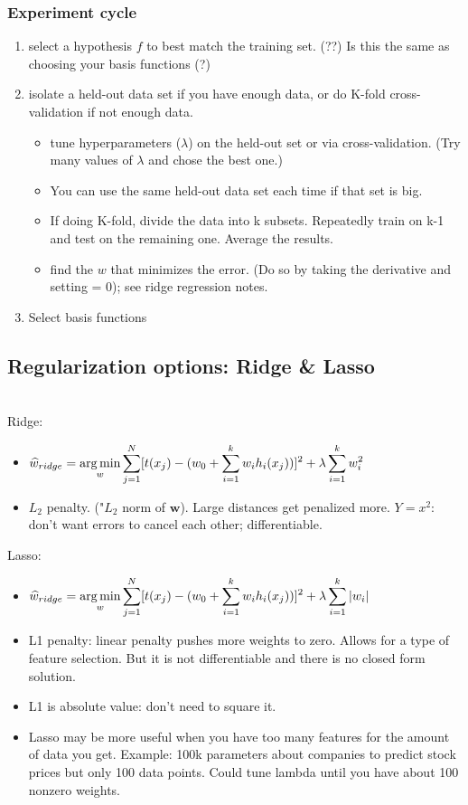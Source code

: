 \subsubsection{Experiment cycle}
\begin{enumerate}
	\item select a hypothesis $f$ to best match the training set.  
		(??) Is this the same as choosing your basis functions (?)
	\item isolate a held-out data set if you have enough data, or do K-fold cross-validation if not enough data. 
	\begin{itemize}
		\item tune hyperparameters ($\lambda$) on the held-out set or via cross-validation.  
			(Try many values of $\lambda$ and chose the best one.) 
		\item You can use the same held-out data set each time if that set is big.  
		\item If doing K-fold, divide the data into k subsets.  
				Repeatedly train on k-1 and test on the remaining one.  
				Average the results. 
		\item find the $w$ that minimizes the error.  
			(Do so by taking the derivative and setting = 0); 
			see ridge regression notes. 
	\end{itemize}
	\item Select basis functions
\end{enumerate}

\subsection{Regularization options: Ridge \& Lasso}  \hfill \\
Ridge: 
\begin{itemize}
	\item $ \displaystyle \widehat{w}_{ridge} = \operatorname*{arg\,min}_w \sum_{j=1}^N [t(x_j) - (w_0 + \sum_{i=1}^k w_i h_i(x_j))]^2 + \lambda \sum_{i=1}^k w_i^2   $ 
	\item $L_2$ penalty.  ("$L_2$ norm of $\bm{w}$).  
		Large distances get penalized more.  $Y = x^2$: 
		don't want errors to cancel each other; differentiable. 
\end{itemize}
Lasso: \hfill \\
\begin{itemize}
	\item$ \displaystyle \widehat{w}_{ridge} = \operatorname*{arg\,min}_w \sum_{j=1}^N [t(x_j) - (w_0 + \sum_{i=1}^k w_i h_i(x_j))]^2 + \lambda \sum_{i=1}^k |w_i|   $ 
	\item L1 penalty: linear penalty pushes more weights to zero.  Allows for a type of feature selection.  But it is not differentiable and there is no closed form solution. 
	\item L1 is absolute value: don't need to square it. 
	\item Lasso may be more useful when you have too many features for the amount of data you get.  
		Example: 100k parameters about companies to predict stock prices but only 100 data points.  
		Could tune lambda until you have about 100 nonzero weights. 
\end{itemize}

